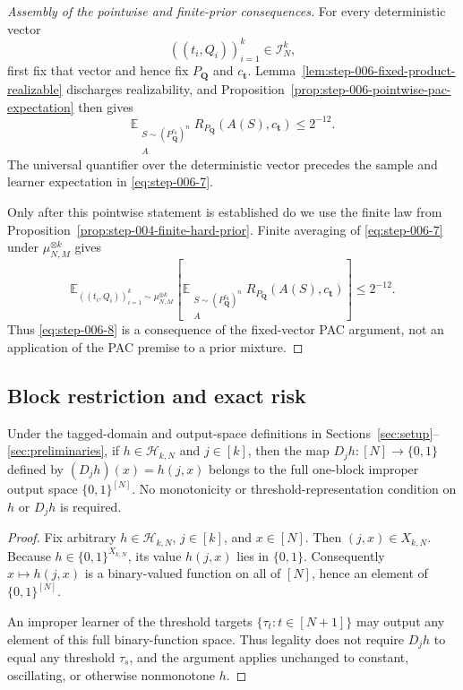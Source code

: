 \begin{proof}[Assembly of the pointwise and finite-prior consequences]
For every deterministic vector
\[
((t_i,Q_i))_{i=1}^k\in\mathcal I_N^k,
\]
first fix that vector and hence
fix $P_{\boldsymbol Q}$ and $c_{\boldsymbol t}$.  Lemma~\ref{lem:step-006-fixed-product-realizable}
discharges realizability, and
Proposition~\ref{prop:step-006-pointwise-pac-expectation} then gives
\begin{equation}
\mathbb E_{\substack{S\sim
(P_{\boldsymbol Q}^{c_{\boldsymbol t}})^n\\A}}
R_{P_{\boldsymbol Q}}(A(S),c_{\boldsymbol t})\le2^{-12}.
\tag{S6.7}\label{eq:step-006-7}
\end{equation}
The universal quantifier over the deterministic vector precedes the sample
and learner expectation in \eqref{eq:step-006-7}.

Only after this pointwise statement is established do we use the finite law
from Proposition~\ref{prop:step-004-finite-hard-prior}.  Finite averaging
of \eqref{eq:step-006-7} under
$\mu_{N,M}^{\otimes k}$ gives
\begin{equation}
\mathbb E_{((t_i,Q_i))_{i=1}^k\sim\mu_{N,M}^{\otimes k}}
\left[
\mathbb E_{\substack{S\sim
(P_{\boldsymbol Q}^{c_{\boldsymbol t}})^n\\A}}
R_{P_{\boldsymbol Q}}(A(S),c_{\boldsymbol t})
\right]
\le2^{-12}.
\tag{S6.8}\label{eq:step-006-8}
\end{equation}
Thus \eqref{eq:step-006-8} is a consequence of the fixed-vector PAC
argument, not an application of the PAC premise to a prior mixture.
\end{proof}

\subsection{Block restriction and exact risk}\label{app:step-007}
\begin{lemma}\label{lem:step-007-restriction-legality}
Under the tagged-domain and output-space definitions in
Sections~\ref{sec:setup}--\ref{sec:preliminaries}, if
\(h\in\mathcal H_{k,N}\) and \(j\in[k]\), then the map
\(D_jh:[N]\to\{0,1\}\) defined by \((D_jh)(x)=h(j,x)\) belongs to the full
one-block improper output space \(\{0,1\}^{[N]}\). No monotonicity or
threshold-representation condition on \(h\) or \(D_jh\) is required.
\end{lemma}

\begin{proof}
Fix arbitrary \(h\in\mathcal H_{k,N}\), \(j\in[k]\), and \(x\in[N]\).
Then \((j,x)\in X_{k,N}\). Because
\(h\in\{0,1\}^{X_{k,N}}\), its value \(h(j,x)\) lies in \(\{0,1\}\).
Consequently \(x\mapsto h(j,x)\) is a binary-valued function on all of
\([N]\), hence an element of \(\{0,1\}^{[N]}\).

An improper learner of the threshold targets \(\{\tau_t:t\in[N+1]\}\)
may output any element of this full binary-function space. Thus legality
does not require \(D_jh\) to equal any threshold \(\tau_s\), and the argument
applies unchanged to constant, oscillating, or otherwise nonmonotone \(h\).
\end{proof}

